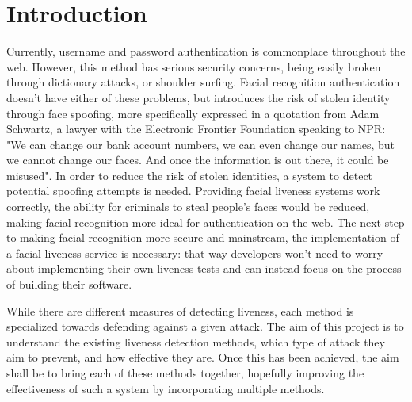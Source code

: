 \documentclass[11pt,a4paper]{article}
\begin{document}
\section{Introduction}
    Currently, username and password authentication is commonplace throughout the web. However, this method has serious security concerns, being easily broken through dictionary attacks,
    or shoulder surfing. Facial recognition authentication doesn't have either of these problems, but introduces the risk of stolen identity through face spoofing, more specifically expressed
    in a quotation from Adam Schwartz, a lawyer with the Electronic Frontier Foundation speaking to NPR: "We can change our bank account numbers, we can even change our names, but we cannot change our faces.
    And once the information is out there, it could be misused". \cite{NPRArticle} In order to reduce the risk of stolen identities, a system to detect potential spoofing attempts is needed.
    Providing facial liveness systems work correctly, the ability for criminals to steal people's faces would be reduced, making facial recognition more ideal for authentication on the web. The next step
    to making facial recognition more secure and mainstream, the implementation of a facial liveness service is necessary: that way developers won't need to worry about implementing their own liveness tests
    and can instead focus on the process of building their software.

   While there are different measures of detecting liveness, each method is specialized towards defending against a given attack. The aim of this project is to understand
   the existing liveness detection methods, which type of attack they aim to prevent, and how effective they are. Once this has been achieved, the aim shall be to bring
   each of these methods together, hopefully improving the effectiveness of such a system by incorporating multiple methods.

\end{document}
